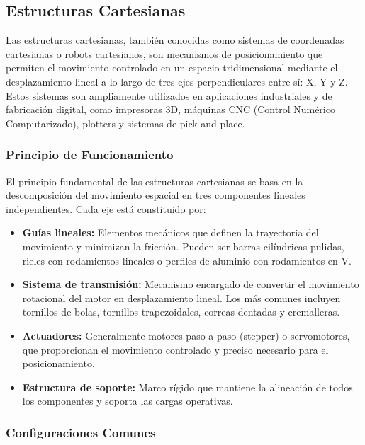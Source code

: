 \subsection{Estructuras Cartesianas}

Las estructuras cartesianas, también conocidas como sistemas de coordenadas cartesianas o robots cartesianos, son mecanismos de posicionamiento que permiten el movimiento controlado en un espacio tridimensional mediante el desplazamiento lineal a lo largo de tres ejes perpendiculares entre sí: X, Y y Z. Estos sistemas son ampliamente utilizados en aplicaciones industriales y de fabricación digital, como impresoras 3D, máquinas CNC (Control Numérico Computarizado), plotters y sistemas de pick-and-place.

\subsubsection{Principio de Funcionamiento}

El principio fundamental de las estructuras cartesianas se basa en la descomposición del movimiento espacial en tres componentes lineales independientes. Cada eje está constituido por:

\begin{itemize}
    \item \textbf{Guías lineales:} Elementos mecánicos que definen la trayectoria del movimiento y minimizan la fricción. Pueden ser barras cilíndricas pulidas, rieles con rodamientos lineales o perfiles de aluminio con rodamientos en V.
    
    \item \textbf{Sistema de transmisión:} Mecanismo encargado de convertir el movimiento rotacional del motor en desplazamiento lineal. Los más comunes incluyen tornillos de bolas, tornillos trapezoidales, correas dentadas y cremalleras.
    
    \item \textbf{Actuadores:} Generalmente motores paso a paso (stepper) o servomotores, que proporcionan el movimiento controlado y preciso necesario para el posicionamiento.
    
    \item \textbf{Estructura de soporte:} Marco rígido que mantiene la alineación de todos los componentes y soporta las cargas operativas.
\end{itemize}

\subsubsection{Configuraciones Comunes}

